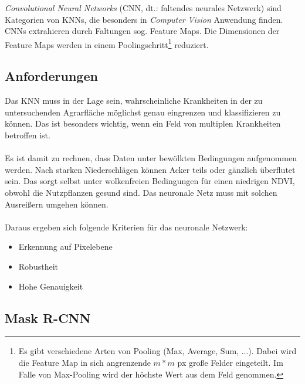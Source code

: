 \noindent
\textit{Convolutional Neural Networks} (CNN, dt.: faltendes neurales Netzwerk) sind Kategorien von KNNs, die besonders in \textit{Computer Vision} Anwendung finden. CNNs extrahieren durch Faltungen sog. Feature Maps. Die Dimensionen der Feature Maps werden in einem Poolingschritt\footnote{Es gibt verschiedene Arten von Pooling (Max, Average, Sum, ...). Dabei wird die Feature Map in sich angrenzende $m*m$ px große Felder eingeteilt. Im Falle von Max-Pooling wird der höchste Wert aus dem Feld genommen.} reduziert.  

\subsection{Anforderungen}\label{sec:sub:requirements}
Das KNN muss in der Lage sein, wahrscheinliche Krankheiten in der zu untersuchenden Agrarfläche möglichst genau eingrenzen und klassifizieren zu können. Das ist besonders wichtig, wenn ein Feld von multiplen Krankheiten betroffen ist.\\\\
Es ist damit zu rechnen, dass Daten unter bewölkten Bedingungen aufgenommen werden. Nach starken Niederschlägen können Acker teils oder gänzlich überflutet sein.\cite{ref:root-rot} Das sorgt selbst unter wolkenfreien Bedingungen für einen niedrigen NDVI, obwohl die Nutzpflanzen gesund sind. Das neuronale Netz muss mit solchen \glqq Ausreißern\grqq{} umgehen können.
\\\\
Daraus ergeben sich folgende Kriterien für das neuronale Netzwerk:

\begin{itemize}
	\item Erkennung auf Pixelebene
	\item Robustheit
	\item Hohe Genauigkeit 
\end{itemize}

\subsection{Mask R-CNN}\label{sec:sub:mask-rcnn}


